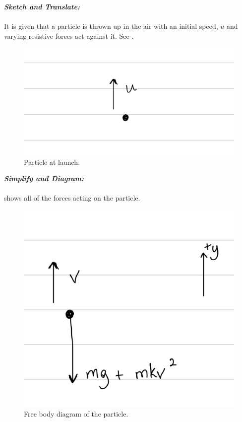 \begin{subquestions}
\textbf{\textit{Sketch and Translate:}} \\ \\
It is given that a particle is thrown up in the air with an initial speed, $u$ and varying resistive forces act against it.
See .
\begin{figure}[H]
	\begin{center}
		\includegraphics[scale=0.25]{../2007/figures/2008Mq6Sketch}
		\caption{\label{2008M:q6:Sketch1} Particle at launch.}
	\end{center}
\end{figure}




\textbf{\textit{Simplify and Diagram:}} \\ \\
 shows all of the forces acting on the particle.
\begin{figure}[H]
	\begin{center}
		\includegraphics[scale=0.25]{../2007/figures/2008Mq6Diagram}
		\caption{\label{2008M:q6:Diagram1} Free body diagram of the particle.}
	\end{center}
\end{figure}


\end{subquestions}
